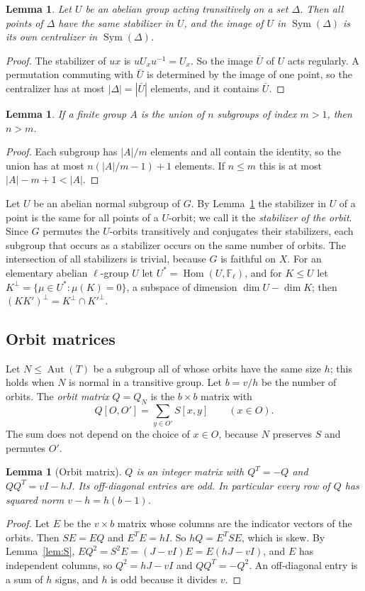 \documentclass[11pt]{amsart}
\newtheorem{lemma}[theorem]{Lemma}
\theoremstyle{definition}
\theoremstyle{remark}
\newcommand{\F}{\mathbb{F}}
\newcommand{\Aut}{\operatorname{Aut}}
\newcommand{\Sym}{\operatorname{Sym}}
\begin{document}
\begin{lemma}\label{lem:regular-abelian}
Let $U$ be an abelian group acting transitively on a set $\Delta$. Then all points of $\Delta$ have the same stabilizer in $U$, and the image of $U$ in $\Sym(\Delta)$ is its own centralizer in $\Sym(\Delta)$.
\end{lemma}
\begin{proof}
The stabilizer of $ux$ is $uU_xu^{-1}=U_x$. So the image $\bar U$ of $U$ acts regularly. A permutation commuting with $\bar U$ is determined by the image of one point, so the centralizer has at most $|\Delta|=|\bar U|$ elements, and it contains $\bar U$.
\end{proof}

\begin{lemma}\label{lem:cover}
If a finite group $A$ is the union of $n$ subgroups of index $m>1$, then $n>m$.
\end{lemma}
\begin{proof}
Each subgroup has $|A|/m$ elements and all contain the identity, so the union has at most $n(|A|/m-1)+1$ elements. If $n\le m$ this is at most $|A|-m+1<|A|$.
\end{proof}

Let $U$ be an abelian normal subgroup of $G$. By Lemma~\ref{lem:regular-abelian} the stabilizer in $U$ of a point is the same for all points of a $U$-orbit; we call it the \emph{stabilizer of the orbit}. Since $G$ permutes the $U$-orbits transitively and conjugates their stabilizers, each subgroup that occurs as a stabilizer occurs on the same number of orbits. The intersection of all stabilizers is trivial, because $G$ is faithful on $X$. For an elementary abelian $\ell$-group $U$ let $U^*=\operatorname{Hom}(U,\F_\ell)$, and for $K\le U$ let $K^\perp=\{\mu\in U^*:\mu(K)=0\}$, a subspace of dimension $\dim U-\dim K$; then $(KK')^\perp=K^\perp\cap K'^\perp$.

\subsection{Orbit matrices}
Let $N\le\Aut(T)$ be a subgroup all of whose orbits have the same size $h$; this holds when $N$ is normal in a transitive group. Let $b=v/h$ be the number of orbits. The \emph{orbit matrix} $Q=Q_N$ is the $b\times b$ matrix with
\[
Q[O,O']=\sum_{y\in O'}S[x,y]\qquad(x\in O).
\]
The sum does not depend on the choice of $x\in O$, because $N$ preserves $S$ and permutes $O'$.

\begin{lemma}[Orbit matrix]\label{lem:Q}
$Q$ is an integer matrix with $Q^{T}=-Q$ and $QQ^{T}=vI-hJ$. Its off-diagonal entries are odd. In particular every row of $Q$ has squared norm $v-h=h(b-1)$.
\end{lemma}
\begin{proof}
Let $E$ be the $v\times b$ matrix whose columns are the indicator vectors of the orbits. Then $SE=EQ$ and $E^{T}E=hI$. So $hQ=E^{T}SE$, which is skew. By Lemma~\ref{lem:S}, $EQ^2=S^2E=(J-vI)E=E(hJ-vI)$, and $E$ has independent columns, so $Q^2=hJ-vI$ and $QQ^{T}=-Q^2$. An off-diagonal entry is a sum of $h$ signs, and $h$ is odd because it divides $v$.
\end{proof}
\end{document}
